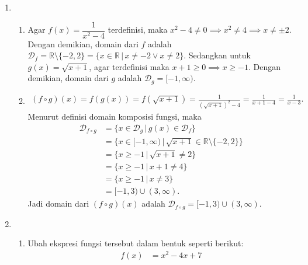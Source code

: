 \documentclass[11pt,openany,a4paper]{article}
\newcommand{\R}{\mathbb{R}}
\begin{document}
\begin{enumerate}
    \item \begin{enumerate}
              \item Agar $f(x) = \dfrac{1}{x^2 - 4}$ terdefinisi, maka $x^2 - 4 \neq 0 \implies x^2 \neq 4 \implies x \neq \pm 2$. Dengan demikian, domain dari $f$ adalah $\mathcal{D}_f = \R \setminus \{-2,2\}=\{x \in \R \,|\, x \ne -2\vee x \ne 2\}$. Sedangkan untuk $g(x) = \sqrt{x+1}$, agar terdefinisi maka $x + 1 \geq 0 \implies x \geq -1$. Dengan demikian, domain dari $g$ adalah $\mathcal{D}_g = [-1,\infty)$.
              \item \begin{align*}
                        (f \circ g)(x)  = f(g(x))
                        = f(\sqrt{x+1})
                        = \frac{1}{(\sqrt{x+1})^2 - 4}
                        = \frac{1}{x + 1 - 4}
                        = \frac{1}{x - 3}.
                    \end{align*}
                    Menurut definisi domain komposisi fungsi, maka
                    \begin{align*}
                        \mathcal{D}_{f \circ g} & = \{x \in \mathcal{D}_g \,|\, g(x) \in \mathcal{D}_f\}           \\
                                                & = \{x \in [-1,\infty) \,|\, \sqrt{x+1} \in \R\setminus\{-2,2\}\} \\
                                                & = \{x \geq -1 \,|\, \sqrt{x+1} \ne 2\}                           \\
                                                & = \{x \geq -1 \,|\, x + 1 \ne 4\}                                \\
                                                & = \{x \geq -1 \,|\, x \ne 3\}                                    \\
                                                & = [-1,3) \cup (3,\infty).
                    \end{align*}
                    Jadi domain dari $(f \circ g)(x)$ adalah $\mathcal{D}_{f \circ g} = [-1,3) \cup (3,\infty)$.
          \end{enumerate}
    \item
          \begin{enumerate}
              \item Ubah ekspresi fungsi tersebut dalam bentuk seperti berikut:
                    \begin{align*}
                        f(x) & = x^2 - 4x + 7       \\

\end{align*}
\end{enumerate}
\end{enumerate}
\end{document}
